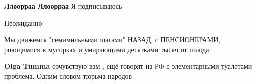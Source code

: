 \begin{itemize}
\begin{itemize}
\textbf{Ллоорраа Ллоорраа} Я подписываюсь
\end{itemize}

 
Неожиданно

 
Мы движемся "семимильными шагами" НАЗАД, с ПЕНСИОНЕРАМИ, роющимися в мусорках и
умирающими десятками тысяч от голода.

\begin{itemize}
 
\textbf{Olga Tumma} сочувствую вам , ещё говорят на РФ с элементарными туалетами проблема. Одним словом тюрьма народов
\end{itemize}

\end{itemize}

